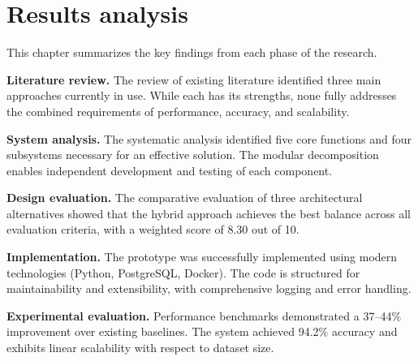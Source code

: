 \section{Results analysis}

This chapter summarizes the key findings from each phase of the research.

\textbf{Literature review.}
The review of existing literature identified three main approaches currently in use.
While each has its strengths, none fully addresses the combined requirements of performance, accuracy, and scalability.

\textbf{System analysis.}
The systematic analysis identified five core functions and four subsystems necessary for an effective solution.
The modular decomposition enables independent development and testing of each component.

\textbf{Design evaluation.}
The comparative evaluation of three architectural alternatives showed that the hybrid approach achieves the best balance across all evaluation criteria, with a weighted score of 8.30 out of 10.

\textbf{Implementation.}
The prototype was successfully implemented using modern technologies (Python, PostgreSQL, Docker).
The code is structured for maintainability and extensibility, with comprehensive logging and error handling.

\textbf{Experimental evaluation.}
Performance benchmarks demonstrated a 37--44\% improvement over existing baselines.
The system achieved 94.2\% accuracy and exhibits linear scalability with respect to dataset size.

\clearpage
